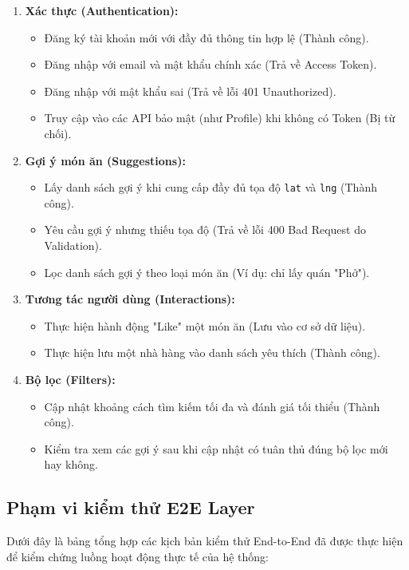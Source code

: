 \begin{enumerate}
    \item \textbf{Xác thực (Authentication):}
    \begin{itemize}
        \item Đăng ký tài khoản mới với đầy đủ thông tin hợp lệ (Thành công).
        \item Đăng nhập với email và mật khẩu chính xác (Trả về Access Token).
        \item Đăng nhập với mật khẩu sai (Trả về lỗi 401 Unauthorized).
        \item Truy cập vào các API bảo mật (như Profile) khi không có Token (Bị từ chối).
    \end{itemize}
    
    \item \textbf{Gợi ý món ăn (Suggestions):}
    \begin{itemize}
        \item Lấy danh sách gợi ý khi cung cấp đầy đủ tọa độ \texttt{lat} và \texttt{lng} (Thành công).
        \item Yêu cầu gợi ý nhưng thiếu tọa độ (Trả về lỗi 400 Bad Request do Validation).
        \item Lọc danh sách gợi ý theo loại món ăn (Ví dụ: chỉ lấy quán "Phở").
    \end{itemize}
    
    \item \textbf{Tương tác người dùng (Interactions):}
    \begin{itemize}
        \item Thực hiện hành động "Like" một món ăn (Lưu vào cơ sở dữ liệu).
        \item Thực hiện lưu một nhà hàng vào danh sách yêu thích (Thành công).
    \end{itemize}
    
    \item \textbf{Bộ lọc (Filters):}
    \begin{itemize}
        \item Cập nhật khoảng cách tìm kiếm tối đa và đánh giá tối thiểu (Thành công).
        \item Kiểm tra xem các gợi ý sau khi cập nhật có tuân thủ đúng bộ lọc mới hay không.
    \end{itemize}
\end{enumerate}

\subsection{Phạm vi kiểm thử E2E Layer}
Dưới đây là bảng tổng hợp các kịch bản kiểm thử End-to-End đã được thực hiện để kiểm chứng luồng hoạt động thực tế của hệ thống:

